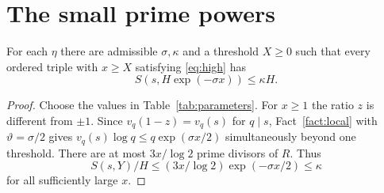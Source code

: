 \section{The small prime powers}\label{sec:small}
\begin{proposition}\label{lem:small}
For each $\eta$ there are admissible $\sigma,\kappa$ and a threshold
$X\ge0$ such that every ordered triple with $x\ge X$ satisfying
\eqref{eq:high} has
\[
 S(s,H\exp(-\sigma x))\le\kappa H .
\]
\end{proposition}
\begin{proof}
Choose the values in Table~\ref{tab:parameters}. For $x\ge1$ the ratio
$z$ is different from $\pm1$. Since $v_q(1-z)=v_q(s)$ for $q\mid s$,
Fact~\ref{fact:local} with $\vartheta=\sigma/2$ gives $v_q(s)\log q\le q\exp(\sigma x/2)$
simultaneously beyond one threshold. There are at most $3x/\log 2$
prime divisors of $R$. Thus
\[
    S(s,Y)/H\le (3x/\log2)\exp(-\sigma x/2)\le\kappa
\]
for all sufficiently large $x$.
\end{proof}
